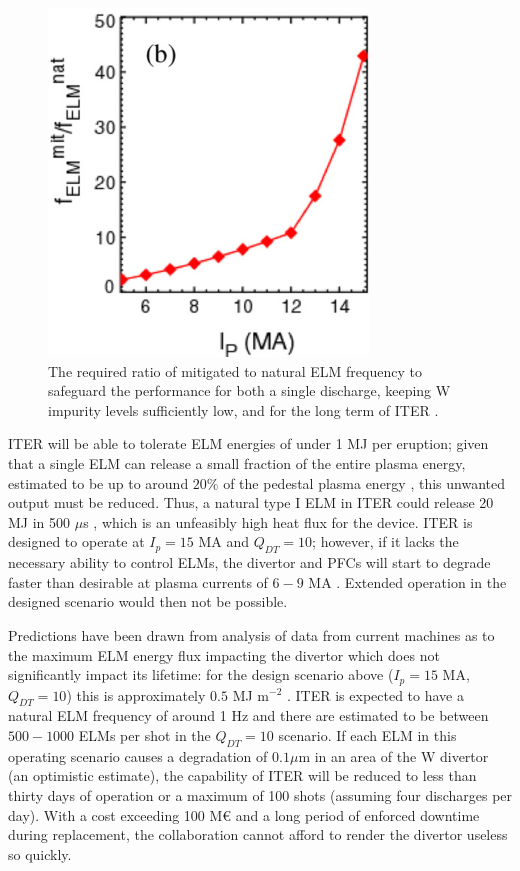 \documentclass[11pt, twocolumn]{article}  %
\begin{document}
\begin{figure}
\includegraphics[scale=0.8]{Figures/FreqEnhance.PNG}
\centering
\caption{The required ratio of mitigated to natural ELM frequency to safeguard the performance for both a single discharge, keeping W impurity levels sufficiently low, and for the long term of ITER \cite{Kirk2013}.}\label{fig:FreqEnhance}
\end{figure}

ITER will be able to tolerate ELM energies of under 1 MJ per eruption; given that a single ELM can release a small fraction of the entire plasma energy, estimated to be up to around $20\%$ of the pedestal plasma energy \cite{Loarte2003}, this unwanted output must be reduced. Thus, a natural type I ELM in ITER could release 20 MJ in 500 $\mu$s \cite{KirkFF}, which is an unfeasibly high heat flux for the device. ITER is designed to operate at $I_p = 15$ MA and $Q_{DT} = 10$; however, if it lacks the necessary ability to control ELMs, the divertor and PFCs will start to degrade faster than desirable at plasma currents of $6-9$ MA \cite{Lang2013}. Extended operation in the designed scenario would then not be possible.

Predictions have been drawn from analysis of data from current machines as to the maximum ELM energy flux impacting the divertor which does not significantly impact its lifetime: for the design scenario above ($I_p = 15$ MA, $Q_{DT} = 10$) this is approximately $0.5$ MJ m$^{-2}$ \cite{LoarteTR2013}. ITER is expected to have a natural ELM frequency of around 1 Hz \cite{KirkFF} and there are estimated to be between $500-1000$ ELMs per shot in the $Q_{DT}=10$ scenario. If each ELM in this operating scenario causes a degradation of $0.1 \mu$m in an area of the W divertor (an optimistic estimate), the capability of ITER will be reduced to less than thirty days of operation or a maximum of 100 shots \cite{Lang2013} (assuming four discharges per day). With a cost exceeding 100 M€ \cite{Tsitrone2013} and a long period of enforced downtime during replacement, the collaboration cannot afford to render the divertor useless so quickly.
\end{document}
